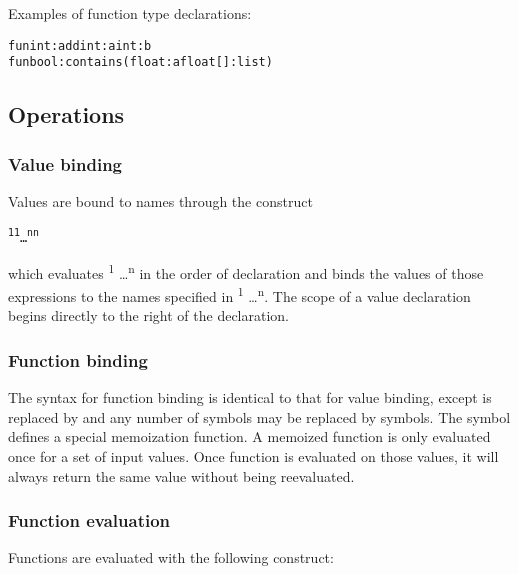 Examples of function type declarations: 

\begin{alltt}
\quad fun int:add int:a int:b
\quad fun bool:contains (float:a float[]:list)
\end{alltt}

\subsection{Operations}

\subsubsection{Value binding}

Values are bound to names through the construct 

\begin{alltt}
\quad {}\textsuperscript{1} \term{=} \textsuperscript{1}   \dots {} \textsuperscript{n} \term{=} \textsuperscript{n}  
\end{alltt}

which evaluates  \textsuperscript{1} \dots  {}\textsuperscript{n} in the order of declaration and binds the values of those expressions to the names specified in \textsuperscript{1} \dots {}\textsuperscript{n}. The scope of a value declaration begins directly to the right of the declaration. 

\subsubsection{Function binding}

The syntax for function binding is identical to that for value binding, except  is replaced by  and any number of \term{=} symbols may be replaced by \term{:=} symbols. The \term{:=} symbol defines a special memoization function. A memoized function is only evaluated once for a set of input values. Once function is evaluated on those values, it will always return the same value without being reevaluated. 

\subsubsection{Function evaluation}
Functions are evaluated with the following construct:


